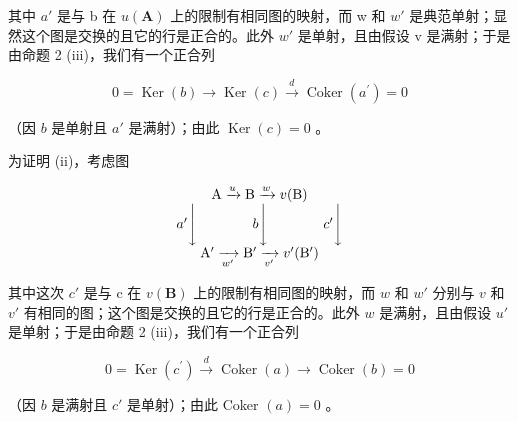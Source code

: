 其中 \(a'\) 是与 b 在 \(u(\mathbf{A})\) 上的限制有相同图的映射，而 w 和 \(w'\) 是典范单射；显然这个图是交换的且它的行是正合的。此外 \(w'\) 是单射，且由假设 v 是满射；于是由命题 2 (iii)，我们有一个正合列

\[
0 = \operatorname{Ker} (b) \longrightarrow \operatorname{Ker} (c) \stackrel {d} {\longrightarrow} \operatorname{Coker} (a ^ {\prime}) = 0
\]

（因 \(b\) 是单射且 \(a'\) 是满射）；由此 \(\operatorname{Ker}(c) = 0\) 。

为证明 (ii)，考虑图

\[
\begin{array}{c} \mathrm{A} \xrightarrow {u} \mathrm{B} \xrightarrow {w} v (\mathrm{B}) \\ a ^ {\prime} \Biggl \downarrow \qquad \qquad b \Biggl \downarrow \qquad \qquad c ^ {\prime} \Biggl \downarrow \\ \mathrm{A} ^ {\prime} \xrightarrow [ w ^ {\prime} ]{} \mathrm{B} ^ {\prime} \xrightarrow [ v ^ {\prime} ]{} v ^ {\prime} (\mathrm{B} ^ {\prime}) \end{array}
\]

其中这次 \(c'\) 是与 c 在 \(v(\mathbf{B})\) 上的限制有相同图的映射，而 \(w\) 和 \(w'\) 分别与 \(v\) 和 \(v'\) 有相同的图；这个图是交换的且它的行是正合的。此外 \(w\) 是满射，且由假设 \(u'\) 是单射；于是由命题 2 (iii)，我们有一个正合列

\[
0 = \operatorname{Ker} (c ^ {\prime}) \xrightarrow {d} \operatorname{Coker} (a) \longrightarrow \operatorname{Coker} (b) = 0
\]

（因 \(b\) 是满射且 \(c'\) 是单射）；由此 Coker \((a) = 0\) 。

